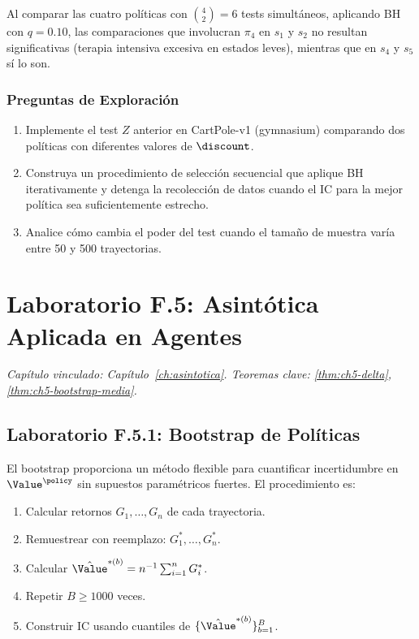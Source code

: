 Al comparar las cuatro políticas con $\binom{4}{2}=6$ tests simultáneos,
aplicando BH con $q=0.10$, las comparaciones que involucran $\pi_4$ en
$s_1$ y $s_2$ no resultan significativas (terapia intensiva excesiva en
estados leves), mientras que en $s_4$ y $s_5$ sí lo son.

\subsubsection*{Preguntas de Exploración}

\begin{enumerate}
    \item Implemente el test $Z$ anterior en CartPole-v1 (gymnasium)
          comparando dos políticas con diferentes valores de $\discount$.
    \item Construya un procedimiento de selección secuencial que aplique
          BH iterativamente y detenga la recolección de datos cuando el
          IC para la mejor política sea suficientemente estrecho.
    \item Analice cómo cambia el poder del test cuando el tamaño de muestra
          varía entre 50 y 500 trayectorias.
\end{enumerate}

\section{Laboratorio F.5: Asintótica Aplicada en Agentes}
\label{lab:F5}
\textit{Capítulo vinculado: Capítulo~\ref{ch:asintotica}.
Teoremas clave: \ref{thm:ch5-delta}, \ref{thm:ch5-bootstrap-media}.}

\bigskip

\subsection*{Laboratorio F.5.1: Bootstrap de Políticas}

El bootstrap proporciona un método flexible para cuantificar incertidumbre
en $\Value^\policy$ sin supuestos paramétricos fuertes. El procedimiento es:

\begin{enumerate}
    \item Calcular retornos $G_1, \ldots, G_n$ de cada trayectoria.
    \item Remuestrear con reemplazo: $G_1^*, \ldots, G_n^*$.
    \item Calcular $\hat{\Value}^{*(b)} = n^{-1}\sum_{i=1}^n G_i^*$.
    \item Repetir $B \geq 1000$ veces.
    \item Construir IC usando cuantiles de $\{\hat{\Value}^{*(b)}\}_{b=1}^B$.
\end{enumerate}

